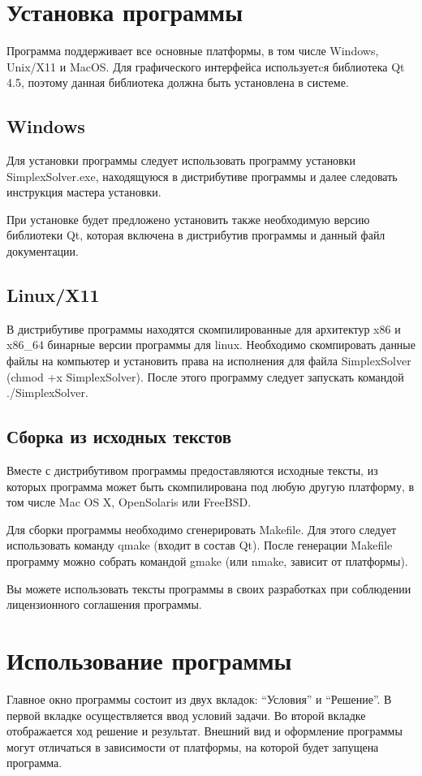 \documentclass[pdftex, unicode, a4paper,12pt,oneside,utf8x, usehyperref]{report-gost}
\begin{document}
\chapter{Установка программы}
Программа поддерживает все основные платформы, в том числе Windows, Unix/X11 и MacOS. Для графического интерфейса используетcя библиотека Qt 4.5, поэтому данная библиотека должна быть установлена в системе.

\section{Windows}
Для установки программы следует использовать программу установки SimplexSolver.exe, находящуюся в дистрибутиве программы и далее следовать инструкция мастера установки.

При установке будет предложено установить также необходимую версию библиотеки Qt, которая включена в дистрибутив программы и данный файл документации.

\section{Linux/X11}
В дистрибутиве программы находятся скомпилированные для архитектур x86 и x86\_64 бинарные версии программы для linux. Необходимо скомпировать данные файлы на компьютер и установить права на исполнения для файла SimplexSolver (chmod +x SimplexSolver). После этого программу следует запускать командой ./SimplexSolver.

\section{Сборка из исходных текстов}
Вместе с дистрибутивом программы предоставляются исходные тексты, из которых программа может быть скомпилирована под любую другую платформу, в том числе Mac OS X, OpenSolaris или FreeBSD.

Для сборки программы необходимо сгенерировать Makefile. Для этого следует использовать команду qmake (входит в состав Qt). После генерации Makefile программу можно собрать командой gmake (или nmake, зависит от платформы).

Вы можете использовать тексты программы в своих разработках при соблюдении лицензионного соглашения программы.

\chapter{Использование программы}
Главное окно программы состоит из двух вкладок: “Условия” и “Решение”.
В первой вкладке осуществляется ввод условий задачи. Во второй вкладке отображается ход решение и результат.
Внешний вид и оформление программы могут отличаться в зависимости от платформы, на которой будет запущена программа.
\end{document}
